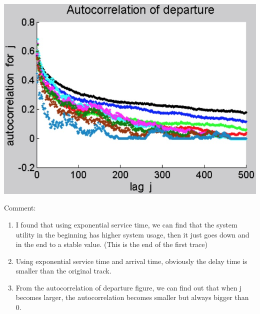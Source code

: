 \documentclass[11pt]{article}
\begin{document}
\begin{center}
\includegraphics[scale=0.3]{hw2_auto}
\end{center}
Comment: 
\begin{enumerate}
\item
I found that using exponential service time, we can find that the system utility in the beginning has higher system usage, then it just goes down and in the end to a stable value. (This is the end of the first trace) 
\item
Using exponential service time and arrival time, obviously the delay time is smaller than the original track.
\item
From the autocorrelation of departure figure, we can find out that when j becomes larger, the autocorrelation becomes smaller but always bigger than 0.
\end{enumerate}
\end{document}
